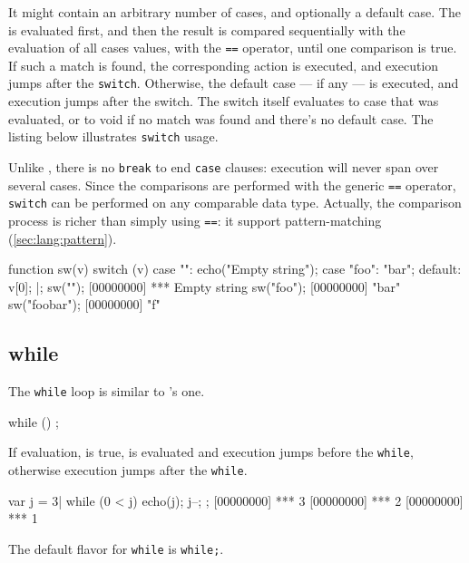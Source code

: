 It might contain an arbitrary number of cases, and optionally a default
case. The  is evaluated first, and then the result is compared
sequentially with the evaluation of all cases values, with the
\lstinline|==| operator, until one comparison is true.  If such a match is
found, the corresponding action is executed, and execution jumps after the
\lstinline|switch|. Otherwise, the default case --- if any --- is executed,
and execution jumps after the switch. The switch itself evaluates to case
that was evaluated, or to void if no match was found and there's no default
case. The listing below illustrates \lstinline|switch| usage.

Unlike \langC, there is no \lstinline|break| to end \lstinline|case| clauses:
execution will never span over several cases.  Since the comparisons are
performed with the generic \lstinline|==| operator, \lstinline|switch| can
be performed on any comparable data type.  Actually, the comparison process
is richer than simply using \lstinline|==|: it support pattern-matching
(\autoref{sec:lang:pattern}).

\begin{urbiscript}
function sw(v)
{
  switch (v)
  {
    case "":
      echo("Empty string");
    case "foo":
      "bar";
    default:
      v[0];
  }
}|;
sw("");
[00000000] *** Empty string
sw("foo");
[00000000] "bar"
sw("foobar");
[00000000] "f"
\end{urbiscript}

\subsection{while}
\label{sec:lang:while}

The \lstinline|while| loop is similar to \langC's one.

\begin{urbiunchecked}
while ()
  ;
\end{urbiunchecked}

If  evaluation, is true,  is evaluated and
execution jumps before the \lstinline|while|, otherwise execution
jumps after the \lstinline|while|.

\begin{urbiscript}
var j = 3|
while (0 < j)
{
  echo(j);
  j--;
};
[00000000] *** 3
[00000000] *** 2
[00000000] *** 1
\end{urbiscript}

The default flavor for \lstinline|while| is \lstinline|while;|.

